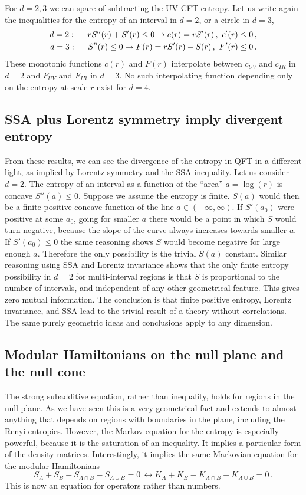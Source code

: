 \documentclass[12pt]{article}
\numberwithin{equation}{section}
\newcommand\eea{\end{eqnarray}}
\newcommand\bea{\begin{eqnarray}}
\newcommand{\be}{\begin{equation}}
\newcommand{\ee}{\end{equation}}
\begin{document}
\bigskip

For $d=2,3$ we can spare of subtracting the UV CFT entropy. 
Let us write again the inequalities for the entropy of an interval in $d=2$, or a circle in $d=3$,
\bea
d=2:\hspace{.5cm}r S''(r)+S'(r)\le 0 \rightarrow c(r)=r S'(r)\,, \,\,c'(r)\le 0\,,\\
d=3:\hspace{.5cm}S''(r)\le 0 \rightarrow F(r)=r S'(r)-S(r)\,,\,\, F'(r)\le 0\,.
\eea
These monotonic functions $c(r)$ and $F(r)$ interpolate between $c_{UV}$ and $c_{IR}$ in $d=2$ and $F_{UV}$ and $F_{IR}$ in $d=3$. No such interpolating function depending only on the entropy at scale $r$ exist for $d=4$. 

 

\subsection{SSA plus Lorentz symmetry imply divergent entropy}

From these results, we can see the divergence of the entropy in QFT in a different light, as implied by Lorentz symmetry and the SSA inequality. 
 Let us consider $d=2$. The entropy of an interval as a function of the ``area'' $a=\log(r)$ is concave $S''(a)\le 0$. 
 Suppose we assume the entropy is finite. $S(a)$ would then be a finite positive concave function of the line $a\in (-\infty,\infty)$.  
 If $S'(a_0)$ were positive at some $a_0$, going for smaller $a$ there would be a point in which $S$ would turn negative, because the slope of the curve always increases towards smaller $a$. If  $S'(a_0)\le 0$ the same reasoning shows $S$ would become negative for large enough $a$. Therefore the only possibility is the trivial $S(a)$ constant. Similar reasoning using SSA and Lorentz invariance shows that the only finite entropy possibility in $d=2$ for multi-interval regions is that $S$ is proportional to the number of intervals, and independent of any other geometrical feature. This gives zero mutual information. The conclusion is that finite positive entropy, Lorentz invariance, and SSA lead to the trivial result of a theory without correlations. The same purely geometric ideas and conclusions apply to any dimension.    


\subsection{Modular Hamiltonians on the null plane and the null cone}
The strong subadditive equation, rather than inequality, holds for regions in the null plane. As we have seen this is a very geometrical fact and extends to almost anything that depends on regions with boundaries in the plane, including the Renyi entropies. However, the Markov equation for the entropy is especially powerful, because it is the saturation of an inequality. It implies a particular form of the density matrices. Interestingly, it implies the same Markovian  equation for the modular Hamiltonians
\be
S_A+S_B-S_{A\cap B}-S_{A\cup B}=0 \,\leftrightarrow K_A+K_B-K_{A\cap B}-K_{A\cup B}=0\,.
\ee
This is now an equation for operators rather than numbers. 
\end{document}
